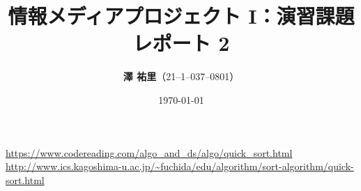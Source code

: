 \documentclass[dvipdfmx]{jsarticle}
\begin{document}
\title{\vspace{10zw}情報メディアプロジェクト I：演習課題レポート 2\\}
\date{\today} %
\author{\Large{\textbf{澤 \/ 祐里}}（21--1--037--0801）} %
 
\thispagestyle{empty}
\maketitle
\thispagestyle{empty}
\clearpage

\setcounter{page}{1}
\setcounter{secnumdepth}{4}
\setcounter{tocdepth}{4}
\hypertarget{mokuji}{\tableofcontents}
\clearpage



\clearpage


\clearpage


\clearpage


\clearpage

\begin{thebibliography}{9}
   \url{https://www.codereading.com/algo_and_ds/algo/quick_sort.html}
   \url{http://www.ics.kagoshima-u.ac.jp/~fuchida/edu/algorithm/sort-algorithm/quick-sort.html}
\end{thebibliography}
\end{document}
